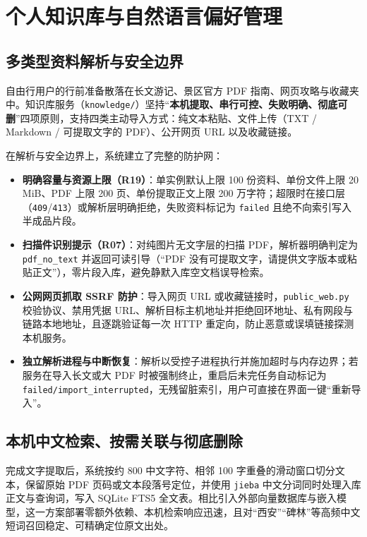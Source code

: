 \section{个人知识库与自然语言偏好管理}

\subsection{多类型资料解析与安全边界}

自由行用户的行前准备散落在长文游记、景区官方 PDF 指南、网页攻略与收藏夹中。知识库服务（\texttt{knowledge/}）坚持“\textbf{本机提取、串行可控、失败明确、彻底可删}”四项原则，支持四类主动导入方式：纯文本粘贴、文件上传（TXT / Markdown / 可提取文字的 PDF）、公开网页 URL 以及收藏链接。

在解析与安全边界上，系统建立了完整的防护网：
\begin{itemize}
  \item \textbf{明确容量与资源上限（R19）}：单实例默认上限 100 份资料、单份文件上限 20 MiB、PDF 上限 200 页、单份提取正文上限 200 万字符；超限时在接口层（\texttt{409}/\texttt{413}）或解析层明确拒绝，失败资料标记为 \texttt{failed} 且绝不向索引写入半成品片段。
  \item \textbf{扫描件识别提示（R07）}：对纯图片无文字层的扫描 PDF，解析器明确判定为 \texttt{pdf\_no\_text} 并返回可读引导（“PDF 没有可提取文字，请提供文字版本或粘贴正文”），零片段入库，避免静默入库空文档误导检索。
  \item \textbf{公网网页抓取 SSRF 防护}：导入网页 URL 或收藏链接时，\texttt{public\_web.py} 校验协议、禁用凭据 URL、解析目标主机地址并拒绝回环地址、私有网段与链路本地地址，且逐跳验证每一次 HTTP 重定向，防止恶意或误填链接探测本机服务。
  \item \textbf{独立解析进程与中断恢复}：解析以受控子进程执行并施加超时与内存边界；若服务在导入长文或大 PDF 时被强制终止，重启后未完任务自动标记为 \texttt{failed/import\_interrupted}，无残留脏索引，用户可直接在界面一键“重新导入”。
\end{itemize}

\subsection{本机中文检索、按需关联与彻底删除}

完成文字提取后，系统按约 800 中文字符、相邻 100 字重叠的滑动窗口切分文本，保留原始 PDF 页码或文本段落号定位，并使用 \texttt{jieba} 中文分词同时处理入库正文与查询词，写入 SQLite FTS5 全文表。相比引入外部向量数据库与嵌入模型，这一方案部署零额外依赖、本机检索响应迅速，且对“西安”“碑林”等高频中文短词召回稳定、可精确定位原文出处。

